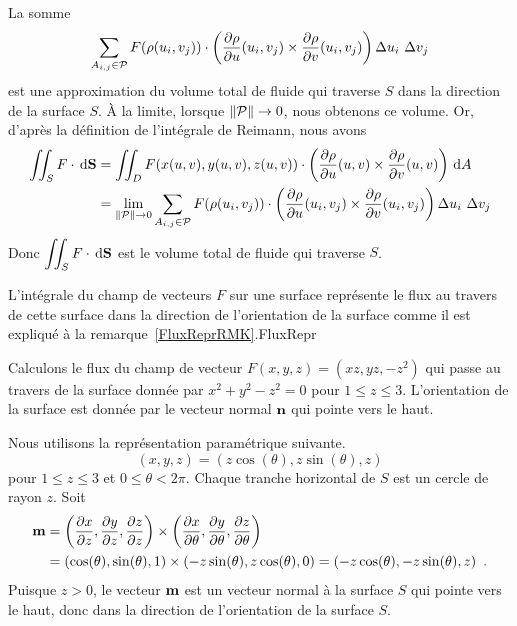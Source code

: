 {\begin{rmk}
La somme
\[
 \sum_{A_{i,j}\in\cal P} F(\rho(u_i,v_j)) \cdot 
\left( \frac{\partial \rho}{\partial u}(u_i,v_j) \times \frac{\partial \rho}{\partial v}(u_i,v_j) \right)
\Delta u_i \ \Delta v_j
\]
est une approximation du volume total de fluide qui traverse $S$ dans
la direction de la surface $S$.  À la limite, lorsque $\|{\cal P}\| \to 0$,
nous obtenons ce volume.
Or, d'après la définition de l'intégrale de Reimann, nous avons
\begin{align*}
\iint_S F \cdot \,\mathrm{d}\mathbf{S}
&= \iint_D F(x(u,v),y(u,v),z(u,v)) \cdot \left(\frac{\partial \rho}{\partial u}(u,v)
\times \frac{\partial \rho}{\partial v}(u,v)\right) \,\mathrm{d}A \\
&=
\lim_{\|{\cal P}\|\to 0} \sum_{A_{i,j}\in\cal P}
F(\rho(u_i,v_j)) \cdot 
\left( \frac{\partial \rho}{\partial u}(u_i,v_j) \times \frac{\partial \rho}{\partial v}(u_i,v_j) \right)
\Delta u_i \ \Delta v_j
\end{align*}
Donc $\displaystyle \iint_S F \cdot \,\mathrm{d}\mathbf{S}$ est le
volume total de fluide qui traverse $S$.
\label{FluxReprRMK}
\end{rmk}

{L'intégrale du champ de vecteurs $F$ sur une surface
représente le flux au travers de cette surface dans la direction de
l'orientation de la surface comme il est expliqué à la
remarque~\ref{FluxReprRMK}.}{FluxRepr}

\begin{egg}
Calculons le flux du champ de vecteur $F(x,y,z) = (xz, yz,-z^2)$
qui passe au travers de la surface donnée par $x^2 + y^2 - z^2 =0$ pour
$1 \leq z \leq 3$.  L'orientation de la surface est donnée par le vecteur
normal $\mathbf{n}$ qui pointe vers le haut.

Nous utilisons la représentation paramétrique suivante.
\[
 (x,y,z) = (z \cos(\theta), z \sin(\theta), z)
\]
pour $1 \leq z \leq 3$ et $0 \leq \theta < 2\pi$.  Chaque tranche
horizontal de $S$ est un cercle de rayon $z$.  Soit
\begin{align*}
\mathbf{m} &= \left( \frac{\partial x}{\partial z} , \frac{\partial y}{\partial z} , \frac{\partial z}{\partial z} \right)
\times \left( \frac{\partial x}{\partial \theta} , \frac{\partial y}{\partial \theta} ,
\frac{\partial z}{\partial \theta} \right) \\
&= \left( \cos(\theta), \sin(\theta), 1 \right)
\times
\left( -z\sin(\theta) , z\cos(\theta) , 0 \right)
= \left( -z\cos(\theta) , -z \sin(\theta) , z\right) \ .
\end{align*}
Puisque $z>0$, le vecteur $\displaystyle \mathbf{m}$
est un vecteur normal à la surface $S$ qui pointe vers le haut, donc
dans la direction de l'orientation de la surface $S$.


\end{egg}}
